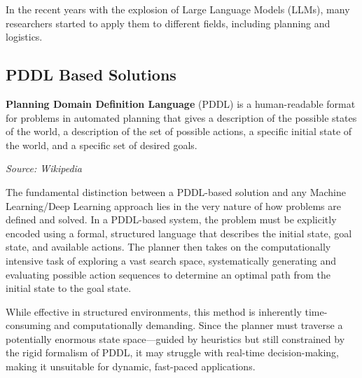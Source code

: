 In the recent years with the explosion of Large Language Models (LLMs), many
researchers started to apply them to different fields, including planning and logistics.


\subsection{PDDL Based Solutions}
\begin{blockquote}
  \textbf{Planning Domain Definition Language} (PDDL) is a human-readable format
  for problems in automated planning that gives a description of the possible
  states of the world, a description of the set of possible actions, a specific
  initial state of the world, and a specific set of desired goals.

  \emph{Source: Wikipedia\footnotemark}
\end{blockquote}

The fundamental distinction between a PDDL-based solution and any Machine Learning/Deep
Learning approach lies in the very nature of how problems are defined and solved.
In a PDDL-based system, the problem must be explicitly encoded using a formal,
structured language that describes the initial state, goal state, and available
actions. The planner then takes on the computationally intensive task of exploring
a vast search space, systematically generating and evaluating possible action
sequences to determine an optimal path from the initial state to the goal state.

While effective in structured environments, this method is inherently time-consuming
and computationally demanding. Since the planner must traverse a potentially
enormous state space—guided by heuristics but still constrained by the rigid
formalism of PDDL, it may struggle with real-time decision-making, making it
unsuitable for dynamic, fast-paced applications.

